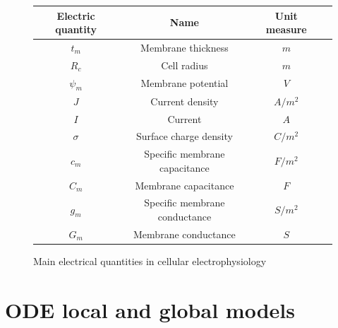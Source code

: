 \documentclass[12pt, a4paper]{report}
\begin{document}
\begin{figure}[H]
	\begin{center}
		\begin{tabular}{ |c|c|c|c| } 
			\hline
			\textbf{Electric quantity} & \textbf{Name} & \textbf{Unit measure} \\
			\hline
			$t_m$ & Membrane thickness & $m$ \\ 
			\hline
			$R_c$ & Cell radius & $m$ \\
			\hline
			$\psi_m$ & Membrane potential & $V$ \\
			\hline
			$J$ & Current density & $A/m^2$ \\
			\hline
			$I$ & Current & $A$ \\
			\hline
			$\sigma$ & Surface charge density & $C/m^2$ \\
			\hline
			$c_m$ & Specific membrane capacitance & $F/m^2$ \\
			\hline
			$C_m$ & Membrane capacitance & $F$ \\
			\hline
			$g_m$ & Specific membrane conductance & $S/m^2$ \\
			\hline
			$G_m$ & Membrane conductance & $S$ \\
			
			\hline
		\end{tabular}
		
	\end{center}
	\caption{Main electrical quantities in cellular electrophysiology}
\end{figure}


\section{ODE local and global models}
\end{document}
